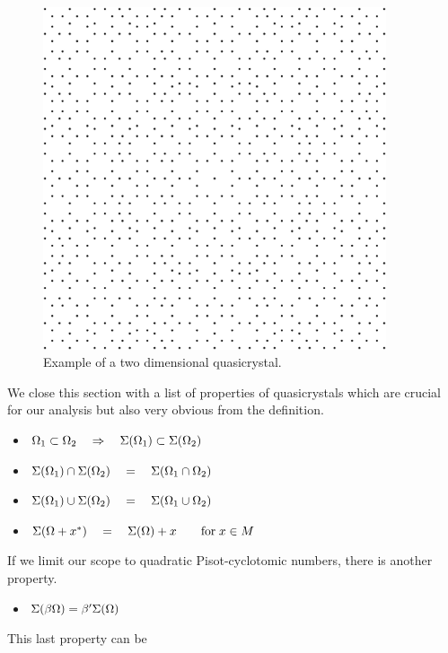 \documentclass[text.tex]{subfiles}
\begin{document}
\begin{figure}[h]
\centering
\includegraphics[width=0.9\textwidth]{img/firstExample}
\caption{Example of a two dimensional quasicrystal.}
\label{fig_quasicrystalFirstExample}
\end{figure}

We close this section with a list of properties of quasicrystals which are crucial for our analysis but also very obvious from the definition. 

\begin{itemize}
\item $\Omega_1\subset\Omega_2 \quad\Rightarrow\quad \Sigma(\Omega_1)\subset\Sigma(\Omega_2)$
\item $\Sigma(\Omega_1)\cap\Sigma(\Omega_2) \quad=\quad \Sigma(\Omega_1\cap\Omega_2)$
\item $\Sigma(\Omega_1)\cup\Sigma(\Omega_2) \quad=\quad \Sigma(\Omega_1\cup\Omega_2)$
\item $\Sigma(\Omega+x^\ast) \quad=\quad \Sigma(\Omega)+x\qquad \text{for}\; x\in M$
\end{itemize}

If we limit our scope to quadratic Pisot-cyclotomic numbers, there is another property. 
\begin{itemize}
\item $\Sigma(\beta\Omega) = \beta'\Sigma(\Omega)$
\end{itemize}
This last property can be 
\end{document}
